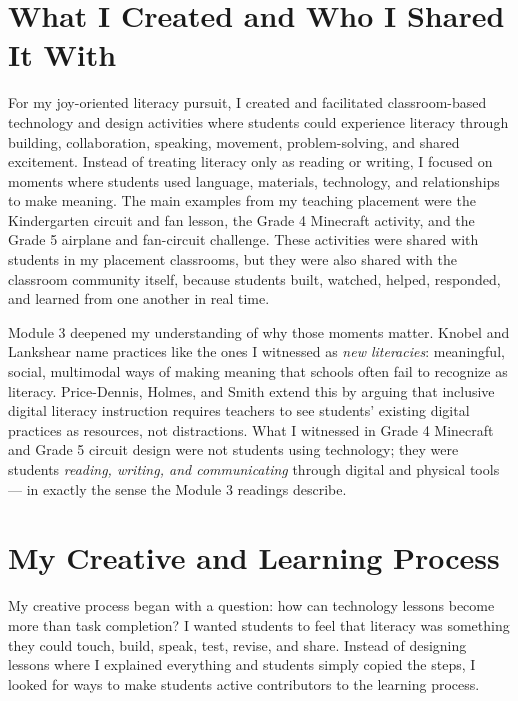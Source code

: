 \documentclass[12pt]{article}
\begin{document}
\section*{What I Created and Who I Shared It With}

For my joy-oriented literacy pursuit, I created and facilitated classroom-based technology and design activities where students could experience literacy through building, collaboration, speaking, movement, problem-solving, and shared excitement. Instead of treating literacy only as reading or writing, I focused on moments where students used language, materials, technology, and relationships to make meaning. The main examples from my teaching placement were the Kindergarten circuit and fan lesson, the Grade 4 Minecraft activity, and the Grade 5 airplane and fan-circuit challenge. These activities were shared with students in my placement classrooms, but they were also shared with the classroom community itself, because students built, watched, helped, responded, and learned from one another in real time.

Module 3 deepened my understanding of why those moments matter. Knobel and Lankshear name practices like the ones I witnessed as \textit{new literacies}: meaningful, social, multimodal ways of making meaning that schools often fail to recognize as literacy. Price-Dennis, Holmes, and Smith extend this by arguing that inclusive digital literacy instruction requires teachers to see students' existing digital practices as resources, not distractions. What I witnessed in Grade 4 Minecraft and Grade 5 circuit design were not students using technology; they were students \textit{reading, writing, and communicating} through digital and physical tools --- in exactly the sense the Module 3 readings describe.

\section*{My Creative and Learning Process}

My creative process began with a question: how can technology lessons become more than task completion? I wanted students to feel that literacy was something they could touch, build, speak, test, revise, and share. Instead of designing lessons where I explained everything and students simply copied the steps, I looked for ways to make students active contributors to the learning process.
\end{document}

